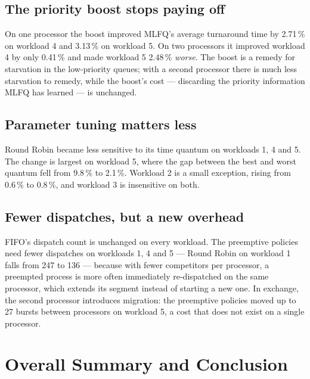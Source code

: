 \documentclass[11pt,a4paper]{article}
\begin{document}
\subsection{The priority boost stops paying off}

On one processor the boost improved MLFQ's average turnaround time by 2.71\,\% on workload 4
and 3.13\,\% on workload 5. On two processors it improved workload 4 by only 0.41\,\% and
made workload 5 2.48\,\% \emph{worse}. The boost is a remedy for starvation in the low-priority
queues; with a second processor there is much less starvation to remedy, while the
boost's cost --- discarding the priority information MLFQ has learned --- is unchanged.

\subsection{Parameter tuning matters less}

Round Robin became less sensitive to its time quantum on workloads 1, 4 and 5. The change is
largest on workload 5, where the gap between the best and worst quantum fell from
9.8\,\% to 2.1\,\%. Workload 2 is a small exception, rising from 0.6\,\% to
0.8\,\%, and workload 3 is insensitive on both.

\subsection{Fewer dispatches, but a new overhead}

FIFO's dispatch count is unchanged on every workload. The preemptive policies need fewer
dispatches on workloads 1, 4 and 5 --- Round Robin on workload 1 falls from 247 to 136 ---
because with fewer competitors per processor, a preempted process is more often immediately
re-dispatched on the same processor, which extends its segment instead of starting a new one.
In exchange, the second processor introduces migration: the preemptive policies moved up to
27 bursts between processors on workload 5, a cost that does not exist on a single processor.

\section{Overall Summary and Conclusion}
\end{document}
